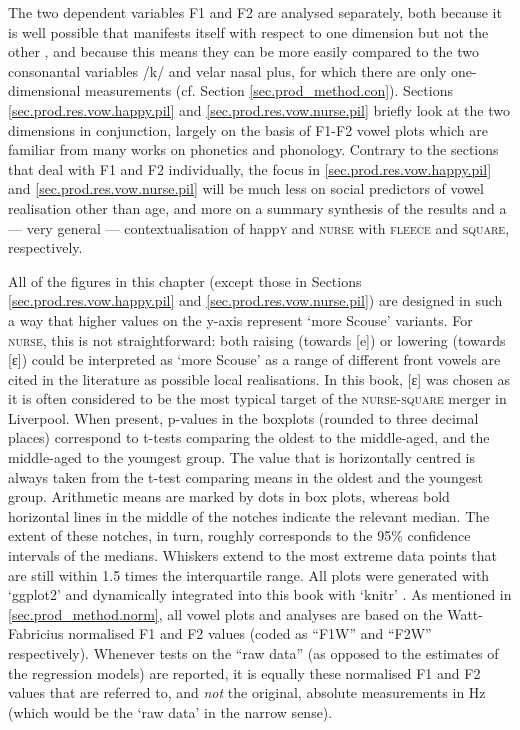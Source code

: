 The two dependent variables F1 and F2 are analysed separately, both because it is well possible that  manifests itself with respect to one dimension but not the other \parencite[cf.][]{harrington2006}, and because this means they can be more easily compared to the two consonantal variables /k/ and velar nasal plus, for which there are only one-dimensional measurements (cf. Section \ref{sec.prod_method.con}).
Sections \ref{sec.prod.res.vow.happy.pil} and \ref{sec.prod.res.vow.nurse.pil} briefly look at the two dimensions in conjunction, largely on the basis of F1-F2 vowel plots which are familiar from many works on phonetics and phonology.
Contrary to the sections that deal with F1 and F2 individually, the focus in \ref{sec.prod.res.vow.happy.pil} and \ref{sec.prod.res.vow.nurse.pil} will be much less on social predictors of vowel realisation other than age, and more on a summary synthesis of the  results and a --- very general --- contextualisation of happ\textsc{y} and \textsc{nurse} with \textsc{fleece} and \textsc{square}, respectively.

All of the figures in this chapter (except those in Sections \ref{sec.prod.res.vow.happy.pil} and \ref{sec.prod.res.vow.nurse.pil}) are designed in such a way that higher values on the y-axis represent `more Scouse' variants.
For \textsc{nurse}, this is not straightforward: both raising (towards [e]) or lowering (towards [ɛ]) could be interpreted as \enquote*{more Scouse} as a range of different front vowels are cited in the literature as possible local realisations.
In this book, [ɛ] was chosen as it is often considered to be the most typical target of the \textsc{nurse}-\textsc{square} merger in Liverpool.
When present, p-values in the boxplots (rounded to three decimal places) correspond to t-tests comparing the oldest to the middle-aged, and the middle-aged to the youngest group.
The value that is horizontally centred is always taken from the t-test comparing means in the oldest and the youngest group.
Arithmetic means are marked by dots in box plots, whereas bold horizontal lines in the middle of the notches indicate the relevant median.
The extent of these notches, in turn, roughly corresponds to the 95\% confidence intervals of the medians.
Whiskers extend to the most extreme data points that are still within 1.5 times the interquartile range.
All plots were generated with `ggplot2' \parencite{ggplot2} and dynamically integrated into this book with `knitr' \parencite{knitr}.
As mentioned in \ref{sec.prod_method.norm}, all vowel plots and analyses are based on the Watt-Fabricius normalised F1 and F2 values (coded as ``F1W'' and ``F2W'' respectively).
Whenever tests on the ``raw data'' (as opposed to the estimates of the regression models) are reported, it is equally these normalised F1 and F2 values that are referred to, and \emph{not} the original, absolute measurements in Hz (which would be the `raw data' in the narrow sense).

